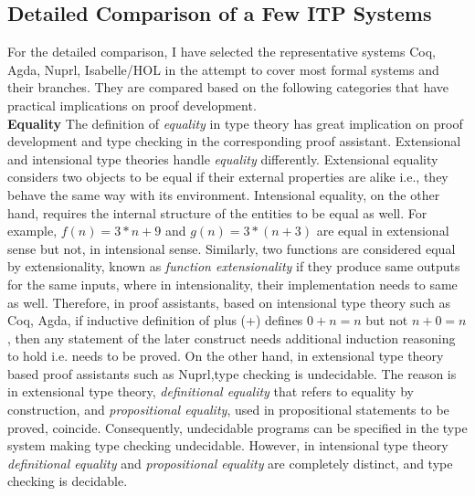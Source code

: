 \subsection{Detailed Comparison of a Few ITP Systems}

For the detailed comparison, I have selected the representative systems Coq, Agda, Nuprl, Isabelle/HOL in the attempt to cover most formal systems and their branches. They are compared based on the following categories that have practical implications on proof development. \\


\textbf{Equality}
The definition of \emph{equality} in type theory has great implication on proof development and type checking in the corresponding proof assistant. Extensional and intensional type theories handle \emph{equality} differently. Extensional equality considers two objects to be equal if their external properties are alike i.e., they behave the same way with its environment. Intensional equality, on the other hand, requires the internal structure of the entities to be equal as well. For example, $f(n) = 3*n + 9$ and $g(n) = 3 * (n+3)$ are equal in extensional sense but not, in intensional sense. Similarly, two functions are considered equal by extensionality, known as \emph{function extensionality} if they produce same outputs for the same inputs, where in intensionality, their implementation needs to same as well. Therefore, in proof assistants, based on intensional type theory such as Coq, Agda, if inductive definition of plus (+) defines $0 + n = n$ but not $n + 0 = n$, then any statement of the later construct needs additional induction reasoning to hold i.e. needs to be proved. On the other hand, in extensional type theory based proof assistants such as Nuprl,type checking is undecidable. The reason is in extensional type theory, \emph{definitional equality} that refers to equality by construction, and \emph{propositional equality}, used in propositional statements to be proved, coincide. Consequently, undecidable programs can be specified in the type system making type checking undecidable. However, in intensional type theory \emph{definitional equality} and \emph{propositional equality} are completely distinct, and type checking is decidable. \\

